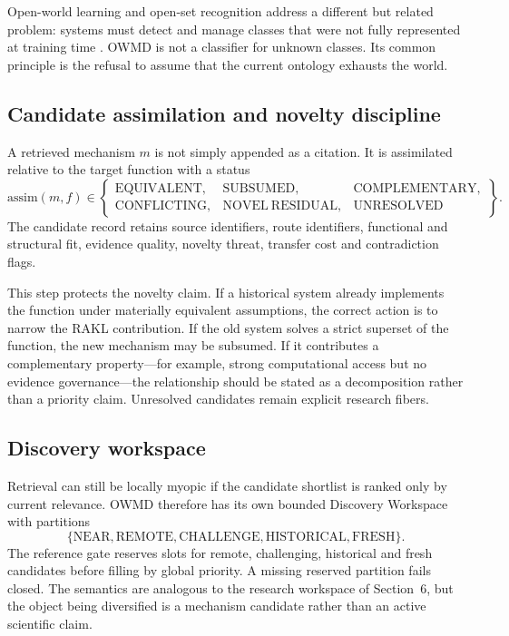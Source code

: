 \documentclass[11pt]{article}
\begin{document}
Open-world learning and open-set recognition address a different but related problem: systems must detect and manage classes that were not fully represented at training time \cite{jafarzadeh2021}. OWMD is not a classifier for unknown classes. Its common principle is the refusal to assume that the current ontology exhausts the world.

\subsection{Candidate assimilation and novelty discipline}

A retrieved mechanism \(m\) is not simply appended as a citation. It is assimilated relative to the target function with a status
\[
\mathrm{assim}(m,f)\in
\left\{
\begin{array}{lll}
\mathrm{EQUIVALENT}, & \mathrm{SUBSUMED}, & \mathrm{COMPLEMENTARY},\\
\mathrm{CONFLICTING}, & \mathrm{NOVEL\ RESIDUAL}, & \mathrm{UNRESOLVED}
\end{array}
\right\}.
\]
The candidate record retains source identifiers, route identifiers, functional and structural fit, evidence quality, novelty threat, transfer cost and contradiction flags.

This step protects the novelty claim. If a historical system already implements the function under materially equivalent assumptions, the correct action is to narrow the RAKL contribution. If the old system solves a strict superset of the function, the new mechanism may be subsumed. If it contributes a complementary property---for example, strong computational access but no evidence governance---the relationship should be stated as a decomposition rather than a priority claim. Unresolved candidates remain explicit research fibers.

\subsection{Discovery workspace}

Retrieval can still be locally myopic if the candidate shortlist is ranked only by current relevance. OWMD therefore has its own bounded Discovery Workspace with partitions
\[
\{\mathrm{NEAR},\mathrm{REMOTE},\mathrm{CHALLENGE},\mathrm{HISTORICAL},\mathrm{FRESH}\}.
\]
The reference gate reserves slots for remote, challenging, historical and fresh candidates before filling by global priority. A missing reserved partition fails closed. The semantics are analogous to the research workspace of Section~6, but the object being diversified is a mechanism candidate rather than an active scientific claim.
\end{document}
